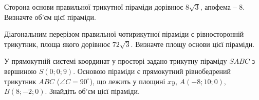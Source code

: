 \documentclass[12pt]{article}
\begin{document}
\begin{samepage}
\noindent\zadnum Сторона основи правильної трикутної піраміди дорівнює $8\sqrt{3}$, апофема – 8. Визначте об’єм цієї піраміди. 

\nmtnobreak
\nopagebreak\nbvspace{0.5cm}
\nmtAnswerBox
\par{}
\end{samepage}

\begin{samepage}
\noindent\zadnum Діагональним перерізом правильної чотирикутної піраміди є рівносторонній трикутник, площа якого дорівнює $72\sqrt{3}$. Визначте площу основи цієї піраміди. 

\nmtnobreak
\nopagebreak\nbvspace{0.5cm}
\nmtAnswerBox
\par{}
\end{samepage}

\begin{samepage}
\noindent\zadnum \begin{minipage}[t]{0.52\textwidth}
У прямокутній системі координат у просторі задано трикутну піраміду $SABC$ з вершиною $S(0; 0; 9)$. Основою піраміди є прямокутний рівнобедрений трикутник $ABC$ ($\angle C = 90^\circ$), що лежить у площині $xy$, $A(-8; 10; 0)$, $B(8; -2; 0)$. Знайдіть об’єм цієї піраміди. 
\end{minipage}
\hfill
\begin{minipage}[t]{0.40\textwidth}
\nopagebreak\nbvspace{-0.3cm}
\begin{center}
\begin{nmtfit}\end{nmtfit}
\end{center}
\end{minipage}

\nmtnobreak
\nopagebreak\nbvspace{0.5cm}
\nmtAnswerBox
\par{}
\end{samepage}
\end{document}
